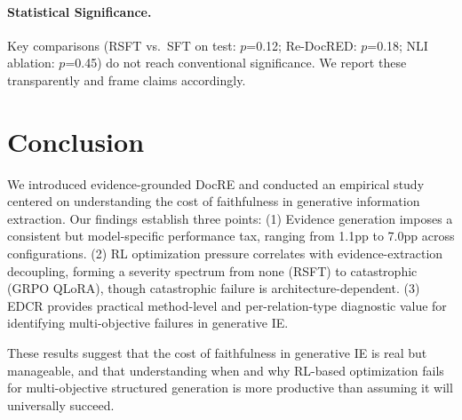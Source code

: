 \documentclass[11pt,a4paper]{article}
\newcommand{\edcr}{EDCR}
\begin{document}
\paragraph{Statistical Significance.}
Key comparisons (RSFT vs.\ SFT on test: $p$=0.12; Re-DocRED: $p$=0.18; NLI ablation: $p$=0.45) do not reach conventional significance.
We report these transparently and frame claims accordingly.

\section{Conclusion}
\label{sec:conclusion}

We introduced evidence-grounded DocRE and conducted an empirical study centered on understanding the cost of faithfulness in generative information extraction.
Our findings establish three points:
(1) Evidence generation imposes a consistent but model-specific performance tax, ranging from 1.1pp to 7.0pp across configurations.
(2) RL optimization pressure correlates with evidence-extraction decoupling, forming a severity spectrum from none (RSFT) to catastrophic (GRPO QLoRA), though catastrophic failure is architecture-dependent.
(3) \edcr{} provides practical method-level and per-relation-type diagnostic value for identifying multi-objective failures in generative IE.

These results suggest that the cost of faithfulness in generative IE is real but manageable, and that understanding when and why RL-based optimization fails for multi-objective structured generation is more productive than assuming it will universally succeed.

% 
% 
\end{document}
